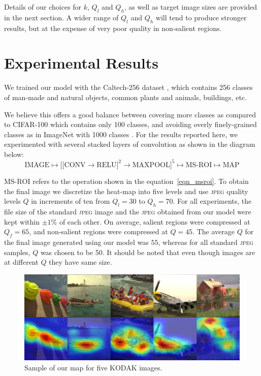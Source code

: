 Details of our choices for $k$, $Q_l$ and $Q_h$, as well as target image sizes are provided in the next section.  A wider range of $Q_l$ and $Q_h$ will tend to produce stronger results, but at the expense of very poor quality in non-salient regions.

\section{Experimental Results}
We trained our model with the Caltech-256 dataset \cite{xxx_griffin2007caltech}, which contains 256 classes of man-made and natural objects, common plants and animals, buildings, etc.

We believe this offers a good balance between covering more classes as compared to CIFAR-100 which contains only 100 classes, and avoiding overly finely-grained classes as in ImageNet with 1000 classes \cite{xxx_imagenet_cvpr09}.
For the results reported here, we experimented with several stacked layers of convolution as shown in the diagram below:
\begin{equation*}
    \text{IMAGE} \longmapsto \bigg[ \big[ \text{CONV} \rightarrow \text{RELU}\big]^2 \rightarrow \text{MAXPOOL} \bigg]^5 \longmapsto \text{MS-ROI} \longmapsto \text{MAP}
\end{equation*}


$\text{MS-ROI}$ refers to the operation shown in the equation~\ref{eqn_msroi}.
To obtain the final image we discretize the heat-map into five levels and use \textsc{jpeg} quality levels $Q$ in increments of ten from $Q_l=30$ to $Q_h=70$.
For all experiments, the file size of the standard \textsc{jpeg} image and the \textsc{jpeg} obtained from our model were kept within $\pm1\%$ of each other.
On average, salient regions were compressed at $Q_f=65$, and non-salient regions were compressed at $Q=45$.
The average $Q$ for the final image generated using our model was $55$, whereas for all standard \textsc{jpeg} samples, $Q$ was chosen to be 50. It should be noted that even though images are at different $Q$ they have same size.

\begin{figure}
    \centering
    \includegraphics[scale=0.37]{figures/semantic/all_images_small.png}
    \caption[Results on KODAK]{Sample of our map for five KODAK images.\label{fig_kodak_combo}}
\end{figure}

